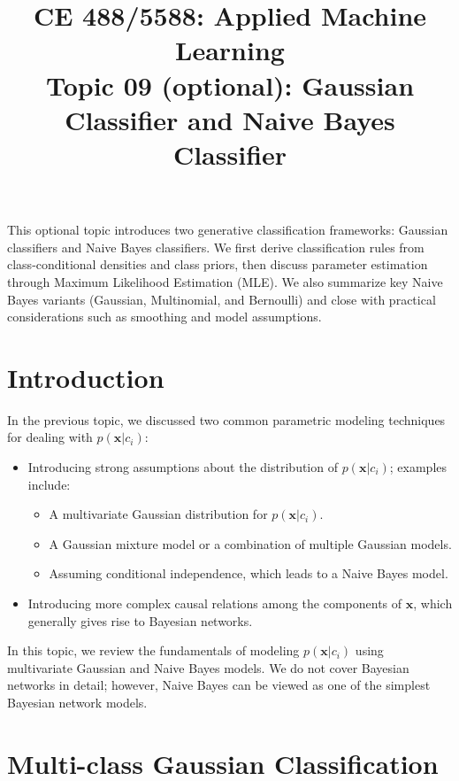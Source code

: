\documentclass[12pt]{article}
\begin{document}
\doublespacing	

\title{CE 488/5588: Applied Machine Learning\\ \large Topic 09 (optional): Gaussian Classifier and Naive Bayes Classifier}
\author{}
\date{}
\maketitle


This optional topic introduces two generative classification frameworks: Gaussian classifiers and Naive Bayes classifiers. We first derive classification rules from class-conditional densities and class priors, then discuss parameter estimation through Maximum Likelihood Estimation (MLE). We also summarize key Naive Bayes variants (Gaussian, Multinomial, and Bernoulli) and close with practical considerations such as smoothing and model assumptions.

\section{Introduction}
In the previous topic, we discussed two common parametric modeling techniques for dealing with \(p(\bm{x}|c_i)\):
\begin{itemize}
    \item Introducing strong assumptions about the distribution of \(p(\bm{x}|c_i)\); examples include:
    \begin{itemize}
        \item A multivariate Gaussian distribution for \(p(\bm{x}|c_i)\).
        \item A Gaussian mixture model or a combination of multiple Gaussian models.
        \item Assuming conditional independence, which leads to a Naive Bayes model.
    \end{itemize}
    \item Introducing more complex causal relations among the components of \(\bm{x}\), which generally gives rise to Bayesian networks.
\end{itemize}

In this topic, we review the fundamentals of modeling \(p(\bm{x}|c_i)\) using multivariate Gaussian and Naive Bayes models. We do not cover Bayesian networks in detail; however, Naive Bayes can be viewed as one of the simplest Bayesian network models.

\section{Multi-class Gaussian Classification}
\end{document}
